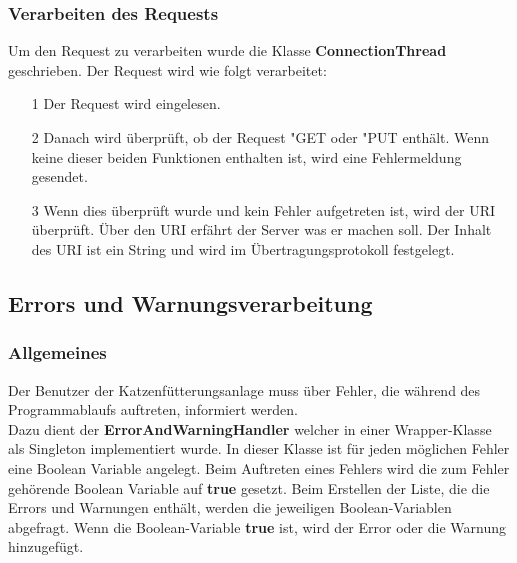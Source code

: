 \subsubsection{Verarbeiten des Requests}
Um den Request zu verarbeiten wurde die Klasse \textbf{ConnectionThread} geschrieben. Der Request wird wie folgt verarbeitet:
\begin{itemize}
\item[1] Der Request wird eingelesen.
\item[2] Danach wird überprüft, ob der Request "GET\grqq{} oder "PUT\grqq{} enthält. Wenn keine dieser beiden Funktionen enthalten ist, wird eine Fehlermeldung gesendet.
\item[3] Wenn dies überprüft wurde und kein Fehler aufgetreten ist, wird der \ac{URI} überprüft. Über den \ac{URI} erfährt der Server was er machen soll. Der Inhalt des \ac{URI} ist ein String und wird im Übertragungsprotokoll festgelegt.
\end{itemize}

\subsection{Errors und Warnungsverarbeitung}
\subsubsection{Allgemeines}
Der Benutzer der Katzenfütterungsanlage muss über Fehler, die während des Programmablaufs auftreten, informiert werden. 
\\ Dazu dient der \textbf{ErrorAndWarningHandler} welcher in einer Wrapper-Klasse als Singleton implementiert wurde. In dieser Klasse ist für jeden möglichen Fehler eine Boolean Variable angelegt. Beim Auftreten eines Fehlers wird die zum Fehler gehörende Boolean Variable auf \textbf{true} gesetzt. Beim Erstellen der Liste, die die Errors und Warnungen enthält, werden die jeweiligen Boolean-Variablen abgefragt. Wenn die Boolean-Variable \textbf{true} ist, wird der Error oder die Warnung hinzugefügt. 

